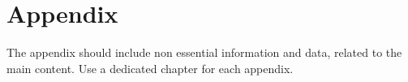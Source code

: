 \chapter{Appendix}

The appendix should include non essential information and data, related to the main content.
Use a dedicated chapter for each appendix.
